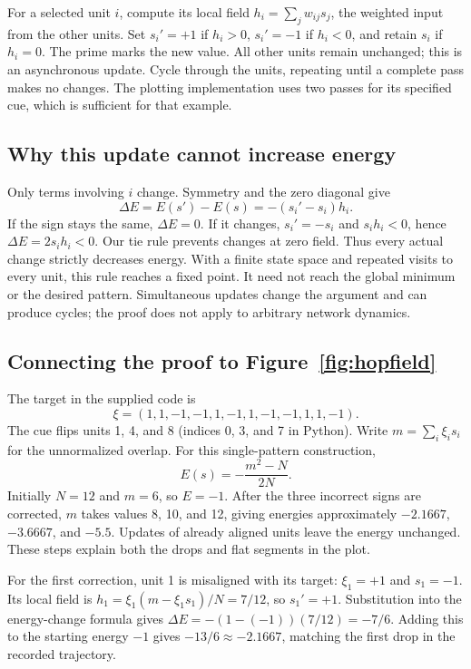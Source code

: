 For a selected unit $i$, compute its local field $h_i=\sum_jw_{ij}s_j$, the weighted input from the other units. Set $s_i'=+1$ if $h_i>0$, $s_i'=-1$ if $h_i<0$, and retain $s_i$ if $h_i=0$. The prime marks the new value. All other units remain unchanged; this is an asynchronous update. Cycle through the units, repeating until a complete pass makes no changes. The plotting implementation uses two passes for its specified cue, which is sufficient for that example.

\subsection{Why this update cannot increase energy}
Only terms involving $i$ change. Symmetry and the zero diagonal give
\begin{equation}
\Delta E=E(s')-E(s)=-(s_i'-s_i)h_i.
\end{equation}
If the sign stays the same, $\Delta E=0$. If it changes, $s_i'=-s_i$ and $s_i h_i<0$, hence $\Delta E=2s_i h_i<0$. Our tie rule prevents changes at zero field. Thus every actual change strictly decreases energy. With a finite state space and repeated visits to every unit, this rule reaches a fixed point. It need not reach the global minimum or the desired pattern. Simultaneous updates change the argument and can produce cycles; the proof does not apply to arbitrary network dynamics.

\subsection{Connecting the proof to Figure~\ref{fig:hopfield}}
The target in the supplied code is
\[
\xi=(1,1,-1,-1,1,-1,1,-1,-1,1,1,-1).
\]
The cue flips units 1, 4, and 8 (indices 0, 3, and 7 in Python). Write $m=\sum_i\xi_i s_i$ for the unnormalized overlap. For this single-pattern construction,
\begin{equation}
E(s)=-\frac{m^2-N}{2N}.
\end{equation}
Initially $N=12$ and $m=6$, so $E=-1$. After the three incorrect signs are corrected, $m$ takes values 8, 10, and 12, giving energies approximately $-2.1667$, $-3.6667$, and $-5.5$. Updates of already aligned units leave the energy unchanged. These steps explain both the drops and flat segments in the plot.

For the first correction, unit 1 is misaligned with its target: $\xi_1=+1$ and $s_1=-1$. Its local field is $h_1=\xi_1(m-\xi_1s_1)/N=7/12$, so $s_1'=+1$. Substitution into the energy-change formula gives $\Delta E=-(1-(-1))(7/12)=-7/6$. Adding this to the starting energy $-1$ gives $-13/6\approx-2.1667$, matching the first drop in the recorded trajectory.

